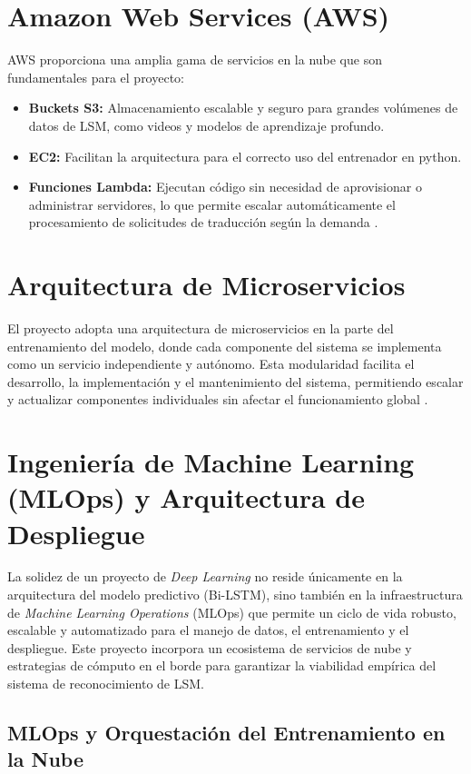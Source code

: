 \section{Amazon Web Services (AWS)}
AWS proporciona una amplia gama de servicios en la nube que son fundamentales para el proyecto:
\begin{itemize}
    \item \textbf{Buckets S3:} Almacenamiento escalable y seguro para grandes volúmenes de datos de LSM, como videos y modelos de aprendizaje profundo.
    \item \textbf{EC2:} Facilitan la arquitectura para el correcto uso del entrenador en python.
    \item \textbf{Funciones Lambda:} Ejecutan código sin necesidad de aprovisionar o administrar servidores, lo que permite escalar automáticamente el procesamiento de solicitudes de traducción según la demanda \cite{ref5}.
\end{itemize}

\section{ Arquitectura de Microservicios}
El proyecto adopta una arquitectura de microservicios en la parte del entrenamiento del modelo, donde cada componente del sistema se implementa como un servicio independiente y autónomo. Esta modularidad facilita el desarrollo, la implementación y el mantenimiento del sistema, permitiendo escalar y actualizar componentes individuales sin afectar el funcionamiento global \cite{ref37}.

\section{Ingeniería de Machine Learning (MLOps) y Arquitectura de Despliegue}
\label{sec:mlops_despliegue}

La solidez de un proyecto de \textit{Deep Learning} no reside únicamente en la arquitectura del modelo predictivo (Bi-LSTM), sino también en la infraestructura de \textit{Machine Learning Operations} (MLOps) que permite un ciclo de vida robusto, escalable y automatizado para el manejo de datos, el entrenamiento y el despliegue. Este proyecto incorpora un ecosistema de servicios de nube y estrategias de cómputo en el borde para garantizar la viabilidad empírica del sistema de reconocimiento de LSM.

\subsection{MLOps y Orquestación del Entrenamiento en la Nube}
\label{subsec:mlops_cloud}

